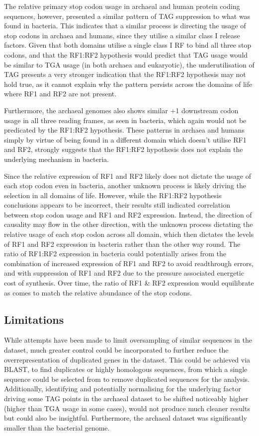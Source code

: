 \documentclass[../main.tex]{subfile}
\begin{document}
    The relative primary stop codon usage in archaeal and human protein coding sequences, however, presented a similar pattern of TAG suppression to what was found in bacteria. This indicates that a similar process is directing the usage of stop codons in archaea and humans, since they utilise a similar class I release factors. Given that both domains utilise a single class I RF to bind all three stop codons, and that the RF1:RF2 hypothesis would predict that TAG usage would be similar to TGA usage (in both archaea and eukaryotic), the underutilisation of TAG presents a very stronger indication that the RF1:RF2 hypothesis may not hold true, as it cannot explain why the pattern persists across the domains of life where RF1 and RF2 are not present.

    Furthermore, the archaeal genomes also shows similar +1 downstream codon usage in all three reading frames, as seen in bacteria, which again would not be predicated by the RF1:RF2 hypothesis.
    These patterns in archaea and humans simply by virtue of being found in a different domain which doesn't utilise RF1 and RF2, strongly suggests that the RF1:RF2 hypothesis does not explain the underlying mechanism in bacteria.

    Since the relative expression of RF1 and RF2 likely does not dictate the usage of each stop codon even in bacteria, another unknown process is likely driving the selection in all domains of life. However, while the RF1:RF2 hypothesis conclusions appears to be incorrect, their results still indicated correlation between stop codon usage and RF1 and RF2 expression. Instead, the direction of causality may flow in the other direction, with the unknown process dictating the relative usage of each stop codon across all domain, which then dictates the levels of RF1 and RF2 expression in bacteria rather than the other way round. The ratio of RF1:RF2 expression in bacteria could potentially arises from the combination of increased expression of RF1 and RF2 to avoid readthrough errors, and with suppression of RF1 and RF2 due to the pressure associated energetic cost of synthesis. Over time, the ratio of RF1 \& RF2 expression would equilibrate as comes to match the relative abundance of the stop codons.

    \subsection{Limitations}
        While attempts have been made to limit oversampling of similar sequences in the dataset, much greater control could be incorporated to further reduce the overrepresentation of duplicated genes in the dataset. This could be achieved via BLAST, to find duplicates or highly homologous sequences, from which a single sequence could be selected from to remove duplicated sequences for the analysis.
        Additionally, identifying and potentially normalising for the underlying factor driving some TAG points in the archaeal dataset to be shifted noticeably higher (higher than TGA usage in some cases), would not produce much cleaner results but could also be insightful.
        Furthermore, the archaeal dataset was significantly smaller than the bacterial genome.
\end{document}
